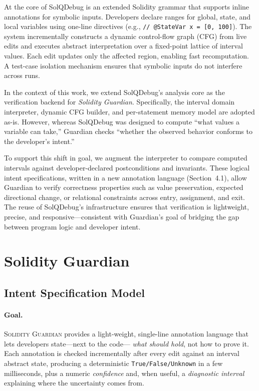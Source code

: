 \documentclass[10pt, conference]{IEEEtran}
\begin{document}
At the core of SolQDebug is an extended Solidity grammar that supports inline annotations for symbolic inputs. Developers declare ranges for global, state, and local variables using one-line directives (e.g., \texttt{// @StateVar x = [0, 100]}). The system incrementally constructs a dynamic control-flow graph (CFG) from live edits and executes abstract interpretation over a fixed-point lattice of interval values. Each edit updates only the affected region, enabling fast recomputation. A test-case isolation mechanism ensures that symbolic inputs do not interfere across runs.

In the context of this work, we extend SolQDebug’s analysis core as the verification backend for \textit{Solidity Guardian}. Specifically, the interval domain interpreter, dynamic CFG builder, and per-statement memory model are adopted as-is. However, whereas SolQDebug was designed to compute “what values a variable can take,” Guardian checks “whether the observed behavior conforms to the developer’s intent.” 

To support this shift in goal, we augment the interpreter to compare computed intervals against developer-declared postconditions and invariants. These logical intent specifications, written in a new annotation language (Section~4.1), allow Guardian to verify correctness properties such as value preservation, expected directional change, or relational constraints across entry, assignment, and exit. The reuse of SolQDebug's infrastructure ensures that verification is lightweight, precise, and responsive—consistent with Guardian’s goal of bridging the gap between program logic and developer intent.


\section{Solidity Guardian}

\subsection{Intent Specification Model}
\label{sec:intent-model}

\paragraph{Goal.}
\textsc{Solidity Guardian} provides a light-weight, single-line
annotation language that lets developers state—next to the code—
\emph{what should hold}, not how to prove it.
Each annotation is checked incrementally after every edit against
an interval abstract state, producing a deterministic
\texttt{True/False/Unknown} in a few milliseconds, plus a numeric
\emph{confidence} and, when useful, a \emph{diagnostic interval}
explaining where the uncertainty comes from.
\end{document}
